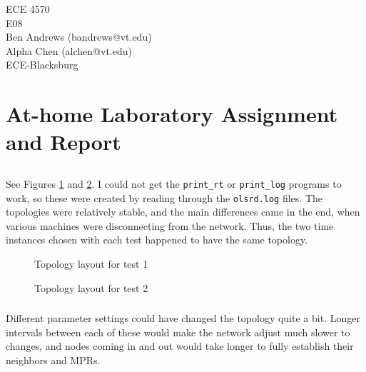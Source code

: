 \documentclass[11pt]{article}
\begin{document}
\begin{flushright}
{ECE 4570}\\{E08}\\{Ben Andrews (bandrews@vt.edu)}\\{Alpha Chen (alchen@vt.edu)}\\{ECE-Blacksburg}\end{flushright}

\section{At-home Laboratory Assignment and Report}

\subsection{}

\subsubsection{}

See Figures \ref{topology_1} and \ref{topology_2}. I could not get the \verb|print_rt| or \verb|print_log| programs to work, so these were created by reading through the \verb|olsrd.log| files. The topologies were relatively stable, and the main differences came in the end, when various machines were disconnecting from the network. Thus, the two time instances chosen with each test happened to have the same topology.

\begin{figure}[hp]
	\caption{Topology layout for test 1}
	\label{topology_1}
\end{figure}

\begin{figure}[hp]
	\caption{Topology layout for test 2}
	\label{topology_2}
\end{figure}

\subsubsection{}

Different parameter settings could have changed the topology quite a bit. Longer intervals between each of these would make the network adjust much slower to changes, and nodes coming in and out would take longer to fully establish their neighbors and MPRs.

\subsection{}
\end{document}

